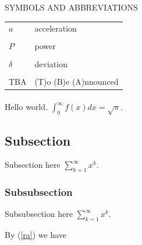 \documentclass[12pt]{article}
\begin{document}

\newpage
{} %
\begin{center}
{SYMBOLS AND ABBREVIATIONS}\\[0.5in]
\end{center}


\begin{tabular}{ll}
$a$ & acceleration\\
& \\
$P$ & power \\
& \\
$\delta$ & deviation\\
& \\
TBA & (T)o (B)e (A)nnounced\\	
\end{tabular}



\setcounter{page}{1}

\paragraph{} Hello world. $\displaystyle \int_0^\infty f(x)dx=\sqrt{\pi}$.


\subsection{Subsection}
Subsection here $\displaystyle \sum_{k=1}^{\infty}x^{k}$.

\subsubsection{Subsubsection}
Subsubsection here $\displaystyle \sum_{k=1}^{\infty}x^{k}$.

\newpage

By (\ref{ra}) we have

\end{document}
